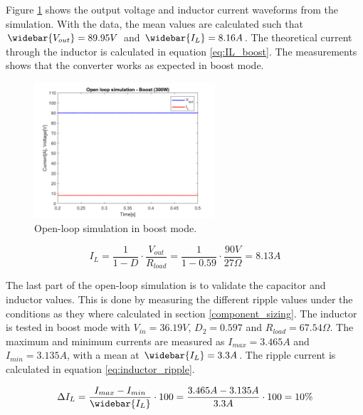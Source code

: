 Figure \ref{fig:OL_boostsimulation} shows the output voltage and inductor current waveforms from the simulation. With the data, the mean values are calculated such that $\widebar{V_{out}} = 89.95V$ and $\widebar{I_L} = 8.16A$. The theoretical current through the inductor is calculated in equation \ref{eq:IL_boost}. The measurements shows that the converter works as expected in boost mode.

\begin{figure}[H]
	\begin{center}
		\includegraphics[width=0.6\textwidth]{../Pictures/P1/Open_loop_simulation/open_loop_boost_300W}
		\caption{Open-loop simulation in boost mode.}
		\label{fig:OL_boostsimulation}
	\end{center}
\end{figure}



\begin{equation} \label{eq:IL_boost}
	I_L = \frac{1}{1-D} \cdot \frac{V_{out}}{R_{load}} = \frac{1}{1-0.59} \cdot \frac{90V}{27\Omega} = 8.13A
\end{equation}

The last part of the open-loop simulation is to validate the capacitor and inductor values. This is done by measuring the different ripple values under the conditions as they where calculated in section \ref{component_sizing}. The inductor is tested in boost mode with $V_{in} = 36.19V$, $D_{2} = 0.597$ and $R_{load} = 67.54\Omega$. The maximum and minimum currents are measured as $I_{max} = 3.465A$ and $I_{min} = 3.135A$, with a mean at $\widebar{I_L} = 3.3A$. The ripple current is calculated in equation \ref{eq:inductor_ripple}.

\begin{equation} \label{eq:inductor_ripple}
	\Delta I_L = \frac{I_{max}-I_{min}}{\widebar{I_L}} \cdot 100 = \frac{3.465A-3.135A}{3.3A} \cdot 100 = 10\%
\end{equation}

